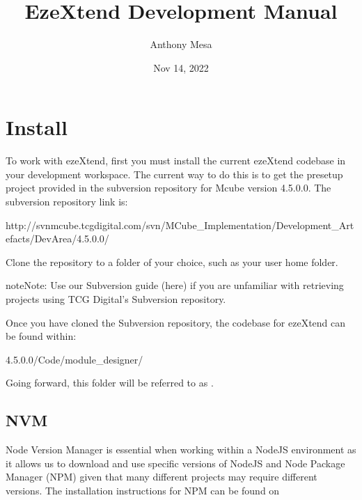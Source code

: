 \documentclass[letterpaper,10pt,english]{sphinxmanual}
\title{EzeXtend Development Manual}
\date{Nov 14, 2022}
\author{Anthony Mesa}
\begin{document}
\pagestyle{empty}
\sphinxmaketitle
\pagestyle{plain}
\sphinxtableofcontents
\pagestyle{normal}
\label{\detokenize{index::doc}}


\sphinxstepscope


\chapter{Install}
\label{\detokenize{install:install}}\label{\detokenize{install::doc}}
\sphinxAtStartPar
To work with ezeXtend, first you must install the current ezeXtend codebase in your development workspace. The current way to do this is to get the pre\sphinxhyphen{}setup project provided in the subversion repository for Mcube version 4.5.0.0. The subversion repository link is:
\begin{sphinxalltt}
http://svnmcube.tcgdigital.com/svn/MCube\_Implementation/Development\_Artefacts/Dev\sphinxhyphen{}Area/4.5.0.0/
\end{sphinxalltt}

\sphinxAtStartPar
Clone the repository to a folder of your choice, such as your user home folder.

\begin{sphinxadmonition}{note}{Note:}
\sphinxAtStartPar
Use our Subversion guide (here) if you are unfamiliar with retrieving projects using TCG Digital’s Subversion repository.
\end{sphinxadmonition}

\sphinxAtStartPar
Once you have cloned the Subversion repository, the codebase for ezeXtend can be found within:
\begin{sphinxalltt}
4.5.0.0/Code/module\_designer/
\end{sphinxalltt}

\sphinxAtStartPar
Going forward, this  folder will be referred to as .


\section{NVM}
\label{\detokenize{install:nvm}}
\sphinxAtStartPar
Node Version Manager is essential when working within a NodeJS environment as it allows us to download and use specific versions of NodeJS and Node Package Manager (NPM) given that many different projects may require different versions. The installation instructions for NPM can be found on 
\end{document}
